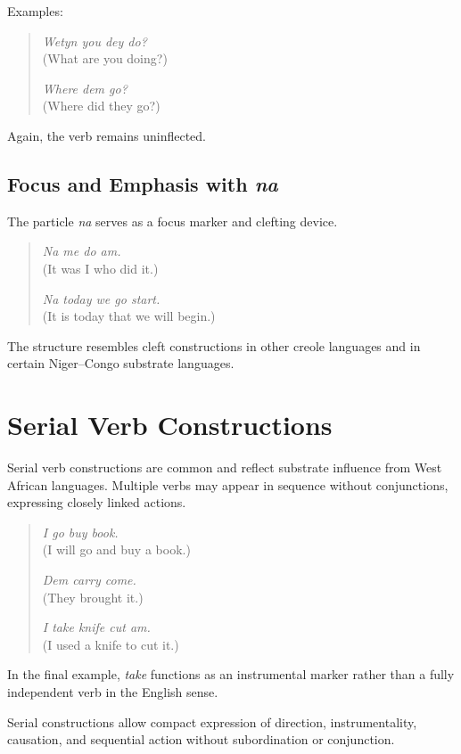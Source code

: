 \documentclass[12pt]{article}
\begin{document}
Examples:

\begin{quote}
\textit{Wetyn you dey do?} \\
(What are you doing?)

\textit{Where dem go?} \\
(Where did they go?)
\end{quote}

Again, the verb remains uninflected.

\subsection{Focus and Emphasis with \textit{na}}

The particle \textit{na} serves as a focus marker and clefting device.

\begin{quote}
\textit{Na me do am.} \\
(It was I who did it.)

\textit{Na today we go start.} \\
(It is today that we will begin.)
\end{quote}

The structure resembles cleft constructions in other creole languages and in certain Niger--Congo substrate languages.

\section{Serial Verb Constructions}

Serial verb constructions are common and reflect substrate influence from West African languages. Multiple verbs may appear in sequence without conjunctions, expressing closely linked actions.

\begin{quote}
\textit{I go buy book.} \\
(I will go and buy a book.)

\textit{Dem carry come.} \\
(They brought it.)

\textit{I take knife cut am.} \\
(I used a knife to cut it.)
\end{quote}

In the final example, \textit{take} functions as an instrumental marker rather than a fully independent verb in the English sense.

Serial constructions allow compact expression of direction, instrumentality, causation, and sequential action without subordination or conjunction.
\end{document}
